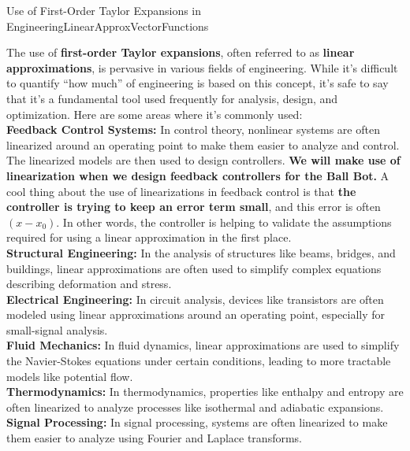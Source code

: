 \begin{funColor}{Use of First-Order Taylor Expansions in Engineering}{LinearApproxVectorFunctions}

    The use of \textbf{first-order Taylor expansions}, often referred to as \textbf{linear approximations}, is pervasive in various fields of engineering. While it's difficult to quantify ``how much'' of engineering is based on this concept, it's safe to say that it's a fundamental tool used frequently for analysis, design, and optimization. Here are some areas where it's commonly used:\\

\textbf{Feedback Control Systems:} In control theory, nonlinear systems are often linearized around an operating point to make them easier to analyze and control. The linearized models are then used to design controllers. {\bf We will make use of linearization when we design feedback controllers for the Ball Bot.} A cool thing about the use of linearizations in feedback control is that \textbf{the controller is trying to keep an error term small}, and this error is often $(x-x_0)$. In other words, the controller is helping to validate the assumptions required for using a linear approximation in the first place. \\

\textbf{Structural Engineering:} In the analysis of structures like beams, bridges, and buildings, linear approximations are often used to simplify complex equations describing deformation and stress. \\

\textbf{Electrical Engineering:}
In circuit analysis, devices like transistors are often modeled using linear approximations around an operating point, especially for small-signal analysis. \\

\textbf{Fluid Mechanics:}
In fluid dynamics, linear approximations are used to simplify the Navier-Stokes equations under certain conditions, leading to more tractable models like potential flow. \\

\textbf{Thermodynamics:}
In thermodynamics, properties like enthalpy and entropy are often linearized to analyze processes like isothermal and adiabatic expansions. \\

\textbf{Signal Processing:}
In signal processing, systems are often linearized to make them easier to analyze using Fourier and Laplace transforms. \\


\end{funColor}
